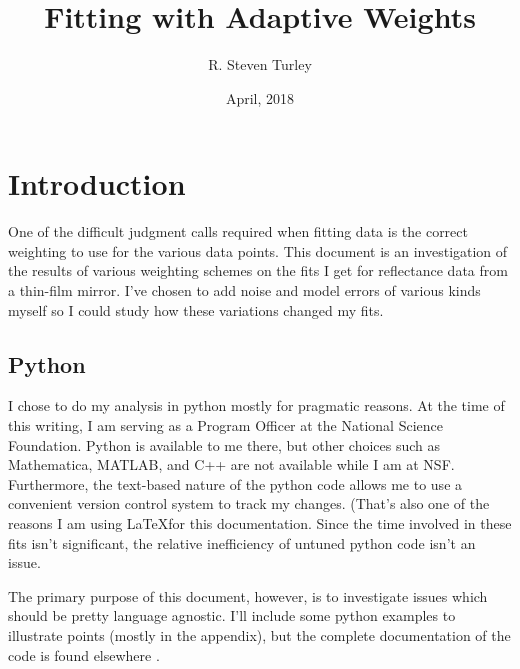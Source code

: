 \documentclass[english]{scrartcl}
\begin{document}
\title{Fitting with Adaptive Weights}
\author{R. Steven Turley}
\date{April, 2018}

\maketitle
\tableofcontents{}

\section{Introduction}

One of the difficult judgment calls required when fitting data is the
correct weighting to use for the various data points. This document
is an investigation of the results of various weighting schemes on the
fits I get for reflectance data from a thin-film mirror. I've chosen
to add noise and model errors of various kinds myself so I could study
how these variations changed my fits.

\subsection{Python}
I chose to do my analysis in python mostly for pragmatic reasons. At
the time of this writing, I am serving as a Program Officer at the
National Science Foundation. Python is available to me there, but other
choices such as Mathematica, MATLAB, and C++ are not available while
I am at NSF. Furthermore, the text-based nature of the python code allows
me to use a convenient version control system to track my changes. (That's
also one of the reasons I am using \LaTeX for this documentation. Since
the time involved in these fits isn't significant, the relative inefficiency
of untuned python code isn't an issue.

The primary purpose of this document, however, is to investigate issues
which should be pretty language agnostic. I'll include some python
examples to illustrate points (mostly in the appendix), but the complete documentation of the code is found elsewhere \cite{rst18}.
\end{document}
